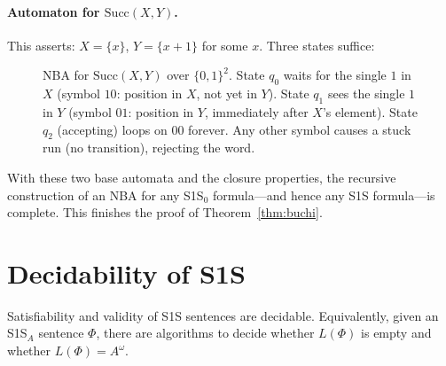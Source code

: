 \paragraph{Automaton for $\mathrm{Succ}(X, Y)$.}
This asserts: $X = \{x\}$, $Y = \{x+1\}$ for some $x$.  Three states suffice:

\begin{figure}[ht]
  \centering
  \caption{NBA for $\mathrm{Succ}(X,Y)$ over $\{0,1\}^2$.  State $q_0$
           waits for the single $1$ in $X$ (symbol $10$: position in $X$,
           not yet in $Y$).  State $q_1$ sees the single $1$ in $Y$ (symbol
           $01$: position in $Y$, immediately after $X$'s element).  State
           $q_2$ (accepting) loops on $00$ forever.  Any other symbol causes
           a stuck run (no transition), rejecting the word.}
  \label{fig:nba-succ}
\end{figure}

With these two base automata and the closure properties, the recursive
construction of an NBA for any S1S$_0$ formula---and hence any S1S
formula---is complete.  This finishes the proof of Theorem~\ref{thm:buchi}.

\section{Decidability of S1S}
\label{sec:s1s-decidability}

\begin{theorem}[Decidability of S1S]
\label{thm:s1s-decidable}
Satisfiability and validity of S1S sentences are decidable.  Equivalently,
given an S1S$_A$ sentence $\Phi$, there are algorithms to decide whether
$L(\Phi)$ is empty and whether $L(\Phi)=A^\omega$.
\end{theorem}

